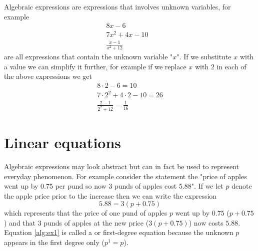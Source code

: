 



Algebraic expressions are expressions that involves unknown variables, for example
\begin{align*}
8x - 6               &   \\
7x^2 + 4x - 10       &  \\
\frac{x-1}{x^2 + 12} &
\end{align*}
are all expressions that contain the unknown variable "$x$". If we substitute $x$ with a value we can simplify it further, for example if we replace $x$ with $2$ in each of the above expressions we get
\begin{align*}
8 \cdot 2 - 6 = 10                \\
7 \cdot 2^2 + 4 \cdot 2 - 10 = 26 \\
\frac{2-1}{2^2 + 12} = \frac{1}{16}
\end{align*}

\section{Linear equations}
Algebraic expressions may look abstract but can in fact be used to represent everyday phenomenon. For example consider the statement the "price of apples went up by 0.75 per pund so now 3 punds of apples cost 5.88". If we let $p$ denote the apple price prior to the increase then we can write the expression
\begin{equation}\label{alg:ex1}
5.88 = 3(p + 0.75)
\end{equation}
which represents that the price of one pund of apples $p$ went up by $0.75$ ($p + 0.75$) and that $3$ punds of apples at the new price ($3(p + 0.75)$) now costs $5.88$. Equation \ref{alg:ex1} is called a  or first-degree equation because the unknown $p$ appears in the first degree only ($p^1 = p$).

